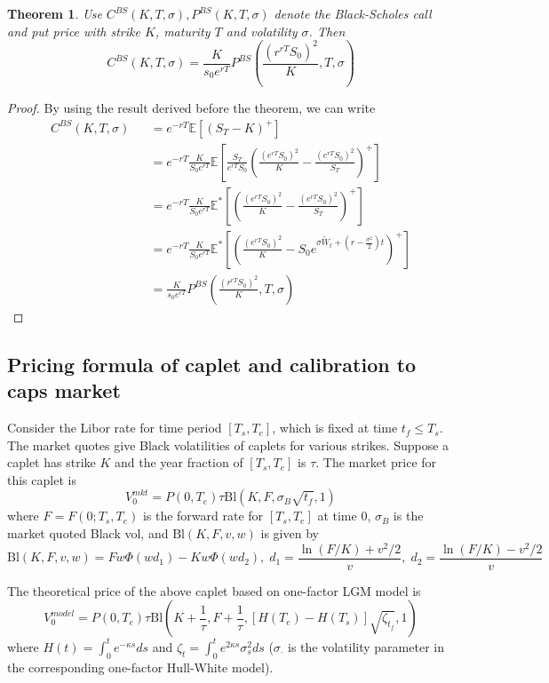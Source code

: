 \documentclass[10pt]{article}
\theoremstyle{plain}
\newtheorem{theorem}{Theorem}[section]
\numberwithin{equation}{section}
\numberwithin{table}{section}
\newcommand{\s}{\sigma}
\newcommand{\prt}[1]{\left( #1 \right)}  %
\newcommand{\E}{\mathbb{E}}
\begin{document}
\begin{theorem}
    Use $C^{BS}(K,T,\s), P^{BS}(K,T,\s)$ denote the Black-Scholes call and put price with strike $K$, maturity $T$ and volatility $\s$. Then 
    \[
        C^{BS}(K,T,\s) = \frac{K}{s_0e^{rT}}P^{BS}\prt{\frac{(r^{rT}S_0)^2}{K},T,\s}    
    \]
\end{theorem}
\begin{proof}

    By using the result derived before the theorem, we can write 
    \begin{eqnarray*}
        C^{BS}(K, T, \s) &&= e^{-rT} \E[(S_T-K)^+] \\
        &&= e^{-rT} \frac{K}{S_0 e^{rT}} \E \left[ \frac{S_T}{e^{rT}S_0} \prt{\frac{(e^{rT} S_0)^2}{K} - \frac{(e^{rT} S_0)^2}{S_T} }^+ \right] \\
        &&= e^{-rT} \frac{K}{S_0 e^{rT}} \E^* \left[\prt{\frac{(e^{rT} S_0)^2}{K} - \frac{(e^{rT} S_0)^2}{S_T} }^+  \right] \\
        &&= e^{-rT} \frac{K}{S_0 e^{rT}} \E^* \left[\prt{\frac{(e^{rT} S_0)^2}{K} - S_0  e^{\s \tilde{W}_t +(r-\frac{\s^2}{2})t} }^+  \right] \\
        &&=\frac{K}{s_0e^{rT}}P^{BS}\prt{\frac{(r^{rT}S_0)^2}{K},T,\s}  
    \end{eqnarray*}
\end{proof}



\subsection{Pricing formula of caplet and calibration to caps market}

Consider the Libor rate for time period $[T_s, T_e]$, which is fixed at time $t_f \le T_s$. The market quotes give Black volatilities of caplets for various strikes. Suppose a caplet has strike $K$ and the year fraction of $[T_s, T_e]$ is $\tau$. The market price for this caplet is
\[
V_0^{mkt} = P(0,T_e)\tau \mbox{Bl}(K, F, \sigma_B\sqrt{t_f}, 1)
\]
where $F=F(0;T_s, T_e)$ is the forward rate for $[T_s, T_e]$ at time $0$, $\sigma_B$ is the market quoted Black vol, and $\mbox{Bl}(K,F,v,w)$ is given by
\[
\mbox{Bl}(K,F,v,w)=Fw\Phi(wd_1) - Kw\Phi(wd_2), \; d_1 = \frac{\ln(F/K)+v^2/2}{v}, \; d_2 = \frac{\ln(F/K)-v^2/2}{v}
\]

The theoretical price of the above caplet based on one-factor LGM model is
\[
V_0^{model} = P(0,T_e)\tau \mbox{Bl}\left(K+\frac{1}{\tau}, F+\frac{1}{\tau}, \left[H(T_e)-H(T_s)\right] \sqrt{\zeta_{t_f}}, 1\right)
\]
where $H(t) = \int_0^t e^{-\kappa s}ds$ and $\zeta_t = \int_0^t e^{2\kappa s}\sigma_s^2 ds$ ($\sigma_{\cdot}$ is the volatility parameter in the corresponding one-factor Hull-White model).
\end{document}
